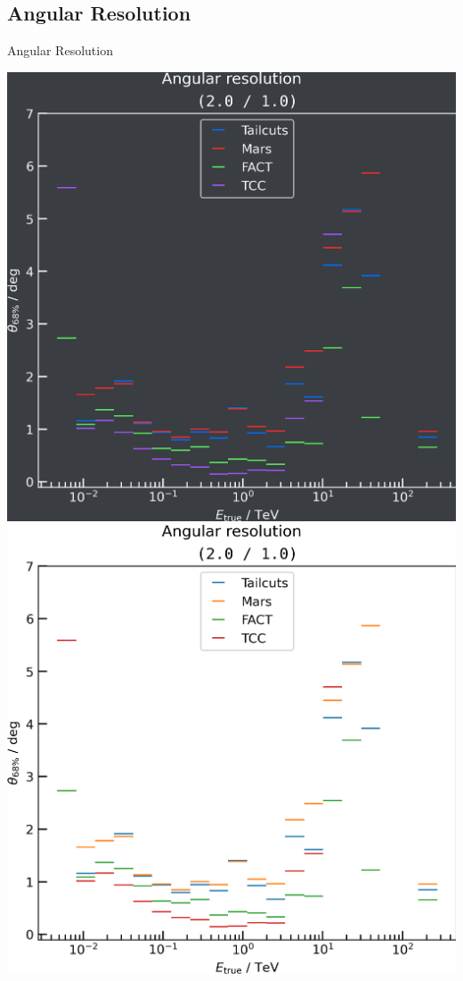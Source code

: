 \subsection{Angular Resolution}
\begin{frame}{Angular Resolution}
  \begin{minipage}{0.32\textwidth}
    \ifdefined\darktheme
      \centering
      \includegraphics[width=\textwidth]{plots/ang_res/ang_res_2.0_1.0_dark.png}
    \else
      \includegraphics[width=\textwidth]{plots/ang_res/ang_res_2.0_1.0_light.png}

\end{minipage}
\end{frame}
